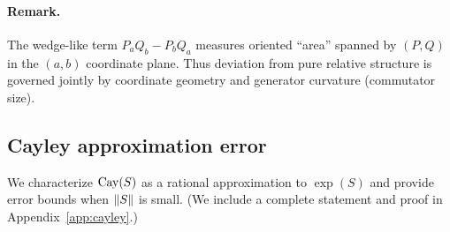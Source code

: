 \paragraph{Remark.}
The wedge-like term $P_aQ_b-P_bQ_a$ measures oriented ``area'' spanned by $(P,Q)$ in the $(a,b)$ coordinate plane.
Thus deviation from pure relative structure is governed jointly by coordinate geometry and generator curvature (commutator size).

\subsection{Cayley approximation error}
We characterize $\mathrm{Cay}(S)$ as a rational approximation to $\exp(S)$ and provide error bounds when $\left\lVert S \right\rVert$ is small.
(We include a complete statement and proof in Appendix~\ref{app:cayley}.)
